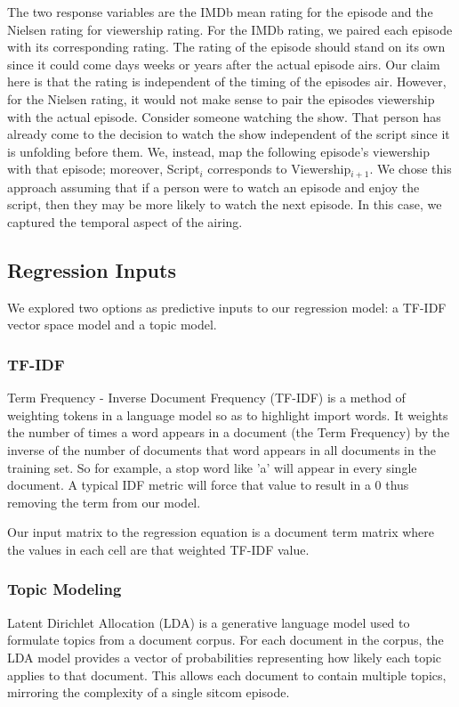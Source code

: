 \documentclass{sig-alternate-05-2015}
\begin{document}
The two response variables are the IMDb mean rating for the episode and the Nielsen rating for viewership rating. For the IMDb rating, we paired each episode with its corresponding rating. The rating of the episode should stand on its own since it could come days weeks or years after the actual episode airs. Our claim here is that the rating is independent of the timing of the episodes air. However, for the Nielsen rating, it would not make sense to pair the episodes viewership with the actual episode. Consider someone watching the show. That person has already come to the decision to watch the show independent of the script since it is unfolding before them. We, instead, map the following episode's viewership with that episode; moreover, Script$_i$ corresponds to Viewership$_{i+1}$. We chose this approach assuming that if a person were to watch an episode and enjoy the script, then they may be more likely to watch the next episode. In this case, we captured the temporal aspect of the airing.

\subsection{Regression Inputs}
We explored two options as predictive inputs to our regression model: a TF-IDF vector space model and a topic model.
\subsubsection{TF-IDF}
Term Frequency - Inverse Document Frequency (TF-IDF) is a method of weighting tokens in a language model so as to highlight import words. It weights the number of times a word appears in a document (the Term Frequency) by the inverse of the number of documents that word appears in all documents in the training set. So for example, a stop word like 'a' will appear in every single document. A typical IDF metric will force that value to result in a 0 thus removing the term from our model. 

Our input matrix to the regression equation is a document term matrix where the values in each cell are that weighted TF-IDF value.

\subsubsection{Topic Modeling}
Latent Dirichlet Allocation (LDA) is a generative language model used to formulate topics from a document corpus. For each document in the corpus, the LDA model provides a vector of probabilities representing how likely each topic applies to that document. This allows each document to contain multiple topics, mirroring the complexity of a single sitcom episode.
\end{document}
